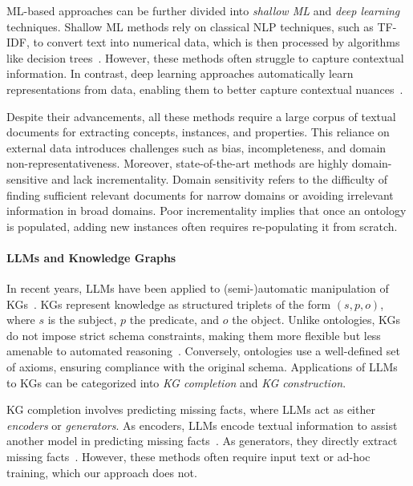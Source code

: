 ML-based approaches can be further divided into \emph{shallow \gls{ML}} and \emph{deep learning} techniques.
%
Shallow \gls{ML} methods rely on classical \gls{NLP} techniques, such as \gls{TF-IDF}, to convert text into numerical data, which is then processed by algorithms like decision trees~\cite{tanev-2006,yoon-2007,maynard-2008,celjuska-2004,etzioni-2005,jiang-2011,souili-2015}.
%
However, these methods often struggle to capture contextual information.
%
In contrast, deep learning approaches automatically learn representations from data, enabling them to better capture contextual nuances~\cite{liu-2013,zeng-2014,ayadi-2019}.


Despite their advancements, all these methods require a large corpus of textual documents for extracting concepts, instances, and properties.
%
This reliance on external data introduces challenges such as bias, incompleteness, and domain non-representativeness.
%
Moreover, state-of-the-art methods are highly domain-sensitive and lack incrementality.
%
Domain sensitivity refers to the difficulty of finding sufficient relevant documents for narrow domains or avoiding irrelevant information in broad domains.
%
Poor incrementality implies that once an ontology is populated, adding new instances often requires re-populating it from scratch.


\paragraph{\glspl{LLM} and Knowledge Graphs}
\label{par:related-works-on-llm-and-knowledge-graphs}
%
In recent years, \glspl{LLM} have been applied to (semi-)automatic manipulation of \glspl{KG}~\cite{roadmap-kg-2024,ZhuWCQOYDCZ24,PanRKSCDJO0LBMB23}.
%
\glspl{KG} represent knowledge as structured triplets of the form \((s, p, o)\), where \(s\) is the subject, \(p\) the predicate, and \(o\) the object.
%
Unlike ontologies, \glspl{KG} do not impose strict schema constraints, making them more flexible but less amenable to automated reasoning~\cite{kg-vs-ontology-2016}.
%
Conversely, ontologies use a well-defined set of axioms, ensuring compliance with the original schema.
%
Applications of \glspl{LLM} to \glspl{KG} can be categorized into \emph{\gls{KG} completion} and \emph{\gls{KG} construction}.


\Gls{KG} completion involves predicting missing facts, where \glspl{LLM} act as either \emph{encoders} or \emph{generators}.
%
As encoders, \glspl{LLM} encode textual information to assist another model in predicting missing facts~\cite{llm-as-encoders-choi-2021,llm-as-encoders-wang-2021,llm-as-encoders-shen-2023}.
%
As generators, they directly extract missing facts~\cite{kg-complenion-saxena-2022,kg-complenion-chen-2022,kg-complenion-xin-2022,ZhuWCQOYDCZ24}.
%
However, these methods often require input text or ad-hoc training, which our approach does not.


